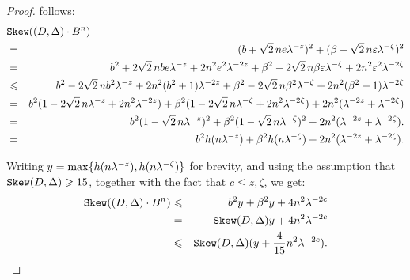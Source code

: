 \begin{proof}
follows:
\begin{eqnarray}
\lefteqn{\sk(\state\cdot B^n)}\nonumber \\
& = & (b+\sqrt{2}\,ne{\lambda^{-z}})^2+
(\beta-\sqrt{2}\,n\varepsilon{\lambda^{-\zeta}})^2\nonumber\\
& = & 
b^2
+2\sqrt{2}\,nbe{\lambda^{-z}}
+2n^2e^2{\lambda^{-2z}}
+\beta^2
-2\sqrt{2}\,n\beta\varepsilon{\lambda^{-\zeta}}
+2n^2\varepsilon^2{\lambda^{-2\zeta}}
\nonumber\\
& \leq & 
b^2
-2\sqrt{2}\,nb^2{\lambda^{-z}}
+2n^2(b^2+1){\lambda^{-2z}}
+\beta^2
-2\sqrt{2}\,n\beta^2{\lambda^{-\zeta}}
+2n^2(\beta^2+1){\lambda^{-2\zeta}}
\nonumber\\
& = & b^2(
1
-2\sqrt{2}\,n{\lambda^{-z}}
+2n^2{\lambda^{-2z}}
)+\beta^2(
1
-2\sqrt{2}\,n{\lambda^{-\zeta}}
+2n^2{\lambda^{-2\zeta}}
)+2n^2({\lambda^{-2z}}+{\lambda^{-2\zeta}})\nonumber \\
& = & 
b^2(1-\sqrt{2}\,n\lambda^{-z})^2
+\beta^2(1-\sqrt{2}\,n{\lambda^{-\zeta}})^2
+ 2n^2({\lambda^{-2z}}+{\lambda^{-2\zeta}}).\nonumber \\
& = & b^2h(n{\lambda^{-z}})+\beta^2h(n{\lambda^{-\zeta}})+ 2n^2({\lambda^{-2z}}+{\lambda^{-2\zeta}}).\nonumber
\end{eqnarray}

\noindent
Writing $y=\max\{h(n{\lambda^{-z}}), h(n{\lambda^{-\zeta}})\}$ for
brevity, and using the assumption that $\sk\state\geq\formula{\P}$,
together with the fact that $c\leq z,\zeta$, we get:
\begin{eqnarray}
\sk(\state \cdot B^n) & \leq & 
b^2y+\beta^2y+ 4n^2\lambda^{-2c} \nonumber\\
& = & \sk\state y +4n^2\lambda^{-2c}\nonumber\\ 
&\leq & \sk\state (y +\frac{4}{\formula{\P}}n^2\lambda^{-2c}) 
\nonumber.
\end{eqnarray}


\end{proof}
